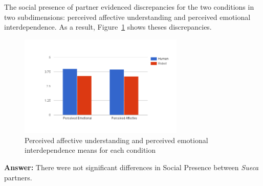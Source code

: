 The social presence of partner evidenced discrepancies for the two conditions in two subdimensions: perceived affective understanding and perceived emotional interdependence.
As a result, Figure~\ref{fig:perceiveEmoAff} shows theses discrepancies.

\begin{figure}[h!]
  \centering
    \includegraphics[width=0.7\textwidth]{./img/6/perceiveEmoAff}
  \caption{Perceived affective understanding and perceived emotional interdependence means for each  condition}
\label{fig:perceiveEmoAff}
\end{figure}

\textbf{Answer:} There were not significant differences in Social Presence between \emph{Sueca} partners.

\clearpage
